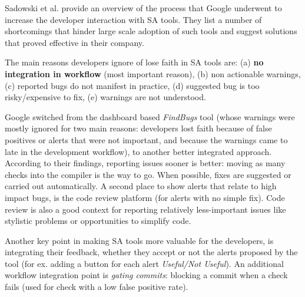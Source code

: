  Sadowski et al. \cite{sa_google} provide an overview of the process that Google underwent to increase the developer interaction with SA tools. They list a number of shortcomings that hinder large scale adoption of such tools and suggest solutions that proved effective in their company. 

 The main reasons developers ignore of lose faith in SA tools are: (a) \textbf{no integration in workflow} (most important reason), (b) non actionable warnings, (c) reported bugs do not manifest in practice, (d) suggested bug is too risky/expensive to fix, (e) warnings are not understood.

 Google switched from the dashboard based \textit{FindBugs} tool (whose warnings were mostly ignored for two main reasons: developers lost faith because of false positives or alerts that were not important, and because the warnings came to late in the development workflow), to another better integrated approach.
 According to their findings, reporting issues sooner is better: moving as many checks into the compiler is the way to go. When possible, fixes are suggested or carried out automatically. A second place to show alerts that relate to high impact bugs, is the code review platform (for alerts with no simple fix). Code review is also a good context for reporting relatively less-important issues like stylistic problems or opportunities to simplify code.

 Another key point in making SA tools more valuable for the developers, is integrating their feedback, whether they accept or not the alerts proposed by the tool (for ex. adding a button for each alert \textit{Useful/Not Useful}).
 An additional workflow integration point is \textit{gating commits}: blocking a commit when a check fails (used for check with a low false positive rate).



